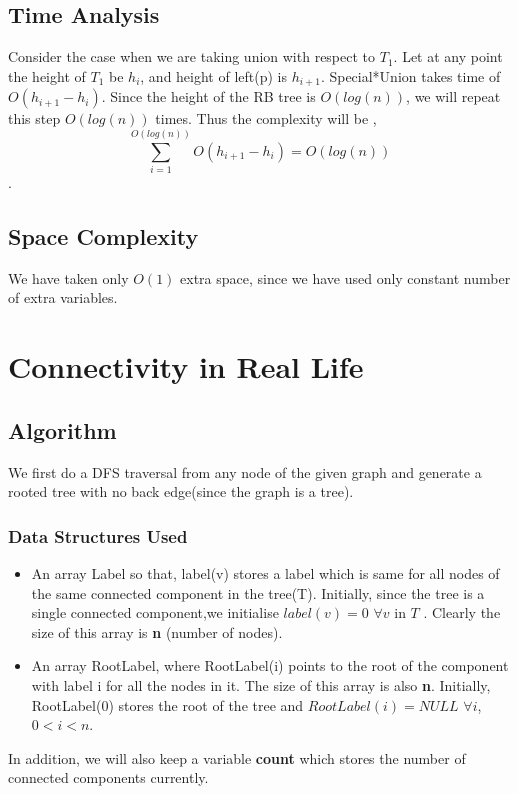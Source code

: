 \documentclass{article}
\begin{document}
\subsection{Time Analysis}
Consider the case when we are taking union with respect to $T_1$. Let at any point the height of $T_1$ be $h_i$, and height of left(p) is $h_{i+1}$. Special*Union takes time of $O(h_{i+1}-h_{i})$. Since the height of the RB tree is $O(log(n))$, we will repeat this step $O(log(n))$ times. Thus the complexity will be ,
$$ \sum_{i=1}^{O(log(n))}O(h_{i+1}-h_{i}) = O(log(n)) $$.

\subsection{Space Complexity}
We have taken only $O(1)$ extra space, since we have used only constant number of extra variables.

\section{Connectivity in Real Life}

\subsection{Algorithm}
We first do a DFS traversal from any node of the given graph and generate a rooted tree with no back edge(since the graph is a tree).

\subsubsection{Data Structures Used}
\begin{itemize}
\item An array Label so that, label(v) stores a label which is same for all nodes of the same connected component in the tree(T).
Initially, since the tree is a single connected component,we initialise $label(v)=0$ $ \forall v$ in $T$ . Clearly the size of this array is {\bf n} (number of nodes).

\item An array RootLabel, where RootLabel(i) points to the root of the component with label i for all the nodes in it. The size of this array is also {\bf n}. Initially, RootLabel(0) stores the root of the tree and $RootLabel(i)=NULL$ $\forall i$, $0<i<n$.
\end{itemize}

In addition, we will also keep a variable \textbf{count} which stores the number of connected components currently. 
\end{document}
